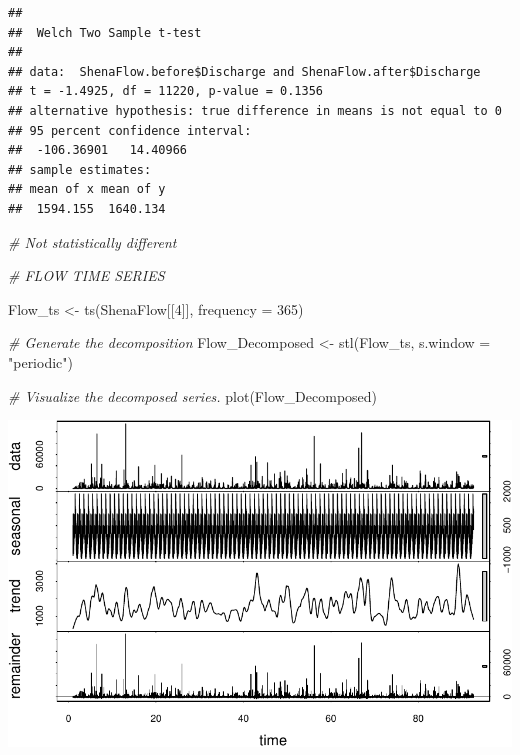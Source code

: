 \documentclass[
  12pt,
]{article}
\newenvironment{Shaded}{\begin{snugshade}}{\end{snugshade}}
\newcommand{\AttributeTok}[1]{\textcolor[rgb]{0.77,0.63,0.00}{#1}}
\newcommand{\CommentTok}[1]{\textcolor[rgb]{0.56,0.35,0.01}{\textit{#1}}}
\newcommand{\ConstantTok}[1]{\textcolor[rgb]{0.00,0.00,0.00}{#1}}
\newcommand{\DecValTok}[1]{\textcolor[rgb]{0.00,0.00,0.81}{#1}}
\newcommand{\FunctionTok}[1]{\textcolor[rgb]{0.00,0.00,0.00}{#1}}
\newcommand{\NormalTok}[1]{#1}
\newcommand{\OtherTok}[1]{\textcolor[rgb]{0.56,0.35,0.01}{#1}}
\newcommand{\SpecialCharTok}[1]{\textcolor[rgb]{0.00,0.00,0.00}{#1}}
\newcommand{\StringTok}[1]{\textcolor[rgb]{0.31,0.60,0.02}{#1}}
\begin{document}
\begin{Shaded}
\end{Shaded}

\begin{verbatim}
## 
##  Welch Two Sample t-test
## 
## data:  ShenaFlow.before$Discharge and ShenaFlow.after$Discharge
## t = -1.4925, df = 11220, p-value = 0.1356
## alternative hypothesis: true difference in means is not equal to 0
## 95 percent confidence interval:
##  -106.36901   14.40966
## sample estimates:
## mean of x mean of y 
##  1594.155  1640.134
\end{verbatim}

\begin{Shaded}
\begin{Highlighting}[]
\CommentTok{\# Not statistically different}
\end{Highlighting}
\end{Shaded}

\begin{Shaded}
\begin{Highlighting}[]
\CommentTok{\# FLOW TIME SERIES}

\NormalTok{Flow\_ts }\OtherTok{\textless{}{-}} \FunctionTok{ts}\NormalTok{(ShenaFlow[[}\DecValTok{4}\NormalTok{]], }\AttributeTok{frequency =} \DecValTok{365}\NormalTok{)}

\CommentTok{\# Generate the decomposition}
\NormalTok{Flow\_Decomposed }\OtherTok{\textless{}{-}} \FunctionTok{stl}\NormalTok{(Flow\_ts, }\AttributeTok{s.window =} \StringTok{"periodic"}\NormalTok{)}

\CommentTok{\# Visualize the decomposed series. }
\FunctionTok{plot}\NormalTok{(Flow\_Decomposed)}
\end{Highlighting}
\end{Shaded}

\includegraphics{Project_Template_files/figure-latex/flow_time_series-1.pdf}
\end{document}
